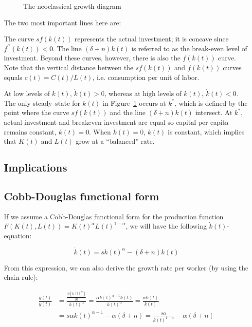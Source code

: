 \documentclass[\topdir/lecture\_notes.tex]{subfiles}
\begin{document}
\begin{figure}[h]
\begin{center}
 \caption{The neoclassical growth diagram}
 \label{fig:solow-neoclassical-growth}
\end{center}
\end{figure}

The two most important lines here are:

The curve \(s f(k(t))\) represents the actual investment; it is concave since \(f^{\prime \prime}(k(t))<0\).
The line \((\delta+n) k(t)\) is referred to as the break-even level of investment.
Beyond these curves, however, there is also the \(f(k(t))\) curve.
Note that the vertical distance between the \(s f(k(t))\) and \(f(k(t))\) curves equals \(c(t)=C(t) / L(t)\), i.e. consumption per unit of labor.

At low levels of \(k(t)\), \(\dot{k}(t)>0\), whereas at high levels of \(k(t)\), \(\dot{k}(t)<0\).
The only steady--state for \(k(t)\) in Figure~\ref{fig:solow-neoclassical-growth} occurs at \(k^{*}\), which is defined by the point where the curve \(s f(k(t))\) and the line \((\delta+n) k(t)\) intersect.
At \(k^{*}\), actual investment and breakeven investment are equal so capital per capita remains constant, \(\dot{k}(t)=0\).
When \(\dot{k}(t)=0\), \(k(t)\) is constant, which implies that \(K(t)\) and \(L(t)\) grow at a ``balanced'' rate.

\subsection{Implications}
\subsection{Cobb-Douglas functional form}
If we assume a Cobb-Douglas functional form for the production function \(F(K(t), L(t)) = K(t)^{\alpha} L(t)^{1-\alpha}\), we will have the following \(\dot{k}(t)\)-equation:

\begin{equation}
  \dot{k}(t)=s k(t)^{\alpha}-(\delta+n) k(t) \label{eq:solow-k-dot-cobb-douglas}
\end{equation}

From this expression, we can also derive the growth rate per worker (by using the chain rule):

\begin{equation}
\begin{aligned}
\frac{\dot{y}(t)}{y(t)} & =\frac{\frac{\partial\left(k(t)^{\alpha}\right)}{\partial t}}{k(t)^{\alpha}}=\frac{\alpha k(t)^{\alpha-1} \dot{k}(t)}{k(t)^{\alpha}}=\frac{\alpha \dot{k}(t)}{k(t)} \\
& =s \alpha k(t)^{\alpha-1}-\alpha(\delta+n)=\frac{s \alpha}{k(t)^{1-\alpha}}-\alpha(\delta+n)
\end{aligned}
\label{eq:solow-growth-rate-per-worker}
\end{equation}
\end{document}
